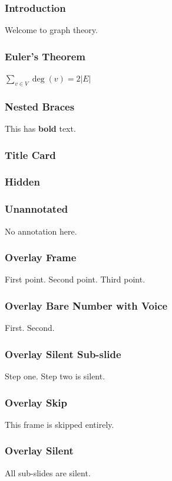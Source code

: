 \documentclass{beamer}
\begin{document}
\begin{frame}
  \frametitle{Introduction}
  Welcome to graph theory.

\end{frame}

\begin{frame}
  \frametitle{Euler's Theorem}
  $\sum_{v \in V} \deg(v) = 2|E|$

\end{frame}

\begin{frame}
  \frametitle{Nested Braces}
  This has \textbf{bold} text.

\end{frame}

\begin{frame}
  \frametitle{Title Card}
  \nonarration
\end{frame}

\begin{frame}
  \frametitle{Hidden}
  \slidesonnetskip
\end{frame}

\begin{frame}
  \frametitle{Unannotated}
  No annotation here.
\end{frame}

\begin{frame}
  \frametitle{Overlay Frame}
  First point.
  \pause
  Second point.
  \pause
  Third point.
\end{frame}

\begin{frame}
  \frametitle{Overlay Bare Number with Voice}
  First.
  \pause
  Second.
\end{frame}

\begin{frame}
  \frametitle{Overlay Silent Sub-slide}
  Step one.
  \pause
  Step two is silent.
\end{frame}

\begin{frame}
  \frametitle{Overlay Skip}
  \slidesonnetskip
  \pause
  This frame is skipped entirely.
\end{frame}

\begin{frame}
  \frametitle{Overlay Silent}
  \nonarration
  \pause
  All sub-slides are silent.
\end{frame}
\end{document}
